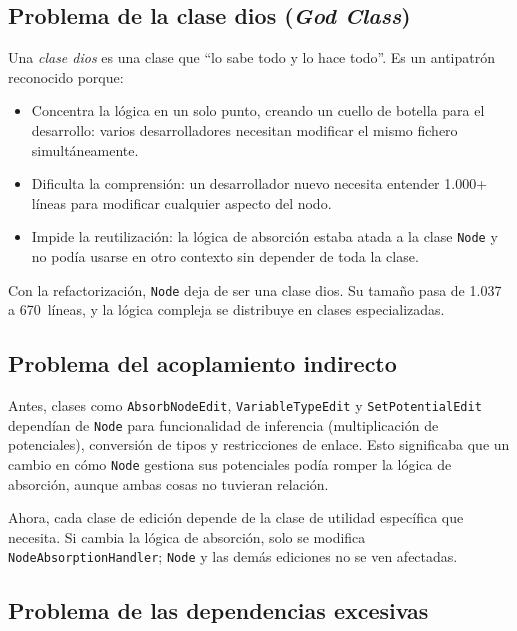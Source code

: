 \documentclass[11pt,a4paper]{article}
\newcommand{\code}[1]{\texttt{#1}}
\begin{document}
\subsection{Problema de la clase dios (\emph{God Class})}

Una \emph{clase dios} es una clase que ``lo sabe todo y lo hace todo''.
Es un antipatr\'on reconocido \cite{riel1996} porque:

\begin{itemize}
  \item Concentra la l\'ogica en un solo punto, creando un cuello de
        botella para el desarrollo: varios desarrolladores necesitan
        modificar el mismo fichero simult\'aneamente.
  \item Dificulta la comprensi\'on: un desarrollador nuevo necesita
        entender 1.000+ l\'ineas para modificar cualquier aspecto del
        nodo.
  \item Impide la reutilizaci\'on: la l\'ogica de absorci\'on estaba
        atada a la clase \code{Node} y no pod\'ia usarse en otro
        contexto sin depender de toda la clase.
\end{itemize}

Con la refactorizaci\'on, \code{Node} deja de ser una clase dios.
Su tama\~no pasa de 1.037 a 670~l\'ineas, y la l\'ogica compleja
se distribuye en clases especializadas.

\subsection{Problema del acoplamiento indirecto}

Antes, clases como \code{AbsorbNodeEdit}, \code{VariableTypeEdit} y
\code{SetPotentialEdit} depend\'ian de \code{Node} para funcionalidad
de inferencia (multiplicaci\'on de potenciales), conversi\'on de tipos
y restricciones de enlace.  Esto significaba que un cambio en c\'omo
\code{Node} gestiona sus potenciales pod\'ia romper la l\'ogica de
absorci\'on, aunque ambas cosas no tuvieran relaci\'on.

Ahora, cada clase de edici\'on depende de la clase de utilidad espec\'ifica
que necesita.  Si cambia la l\'ogica de absorci\'on, solo se modifica
\code{NodeAbsorptionHandler}; \code{Node} y las dem\'as ediciones no se
ven afectadas.

\subsection{Problema de las dependencias excesivas}
\end{document}
